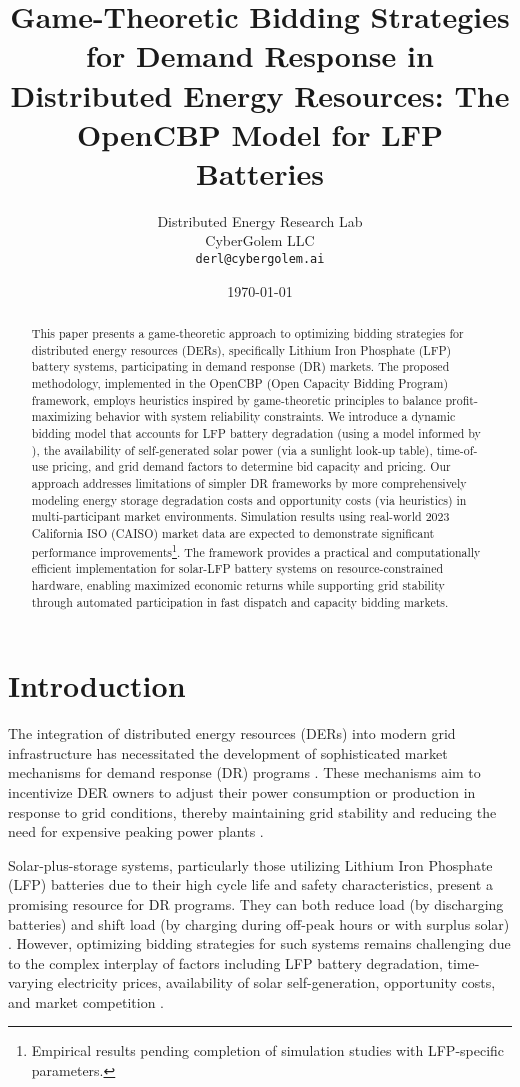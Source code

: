 \documentclass[11pt,a4paper]{article}
\title{Game-Theoretic Bidding Strategies for Demand Response in Distributed Energy Resources: The OpenCBP Model for LFP Batteries}
\author{Distributed Energy Research Lab\\
        CyberGolem LLC\\
        \texttt{derl@cybergolem.ai}}
\date{\today}
\begin{document}
\maketitle

\begin{abstract}
This paper presents a game-theoretic approach to optimizing bidding strategies for distributed energy resources (DERs), specifically Lithium Iron Phosphate (LFP) battery systems, participating in demand response (DR) markets. The proposed methodology, implemented in the OpenCBP (Open Capacity Bidding Program) framework, employs heuristics inspired by game-theoretic principles to balance profit-maximizing behavior with system reliability constraints. We introduce a dynamic bidding model that accounts for LFP battery degradation (using a model informed by \citet{Millner2010}), the availability of self-generated solar power (via a sunlight look-up table), time-of-use pricing, and grid demand factors to determine bid capacity and pricing. Our approach addresses limitations of simpler DR frameworks by more comprehensively modeling energy storage degradation costs and opportunity costs (via heuristics) in multi-participant market environments. Simulation results using real-world 2023 California ISO (CAISO) market data are expected to demonstrate significant performance improvements\footnote{Empirical results pending completion of simulation studies with LFP-specific parameters.}. The framework provides a practical and computationally efficient implementation for solar-LFP battery systems on resource-constrained hardware, enabling maximized economic returns while supporting grid stability through automated participation in fast dispatch and capacity bidding markets.
\end{abstract}

\section{Introduction}
The integration of distributed energy resources (DERs) into modern grid infrastructure has necessitated the development of sophisticated market mechanisms for demand response (DR) programs \citep{Siano2014}. These mechanisms aim to incentivize DER owners to adjust their power consumption or production in response to grid conditions, thereby maintaining grid stability and reducing the need for expensive peaking power plants \citep{Shariatzadeh2015}.

Solar-plus-storage systems, particularly those utilizing Lithium Iron Phosphate (LFP) batteries due to their high cycle life and safety characteristics, present a promising resource for DR programs. They can both reduce load (by discharging batteries) and shift load (by charging during off-peak hours or with surplus solar) \citep{Burger2017}. However, optimizing bidding strategies for such systems remains challenging due to the complex interplay of factors including LFP battery degradation, time-varying electricity prices, availability of solar self-generation, opportunity costs, and market competition \citep{He2016}.
\end{document}
